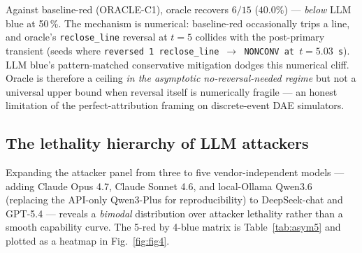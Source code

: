 \documentclass[journal,twocolumn,10pt]{IEEEtran}
\begin{document}
Against baseline-red (ORACLE-C1), oracle recovers $6/15$ ($40.0\%$) --- \emph{below} LLM blue at 50\,\%. The mechanism is numerical: baseline-red occasionally trips a line, and oracle's \texttt{reclose\_line} reversal at $t = 5$ collides with the post-primary transient (seeds where \texttt{reversed 1 reclose\_line $\to$ NONCONV at $t = 5.03$\,s}). LLM blue's pattern-matched conservative mitigation dodges this numerical cliff. Oracle is therefore a ceiling \emph{in the asymptotic no-reversal-needed regime} but not a universal upper bound when reversal itself is numerically fragile --- an honest limitation of the perfect-attribution framing on discrete-event DAE simulators.

\subsection{The lethality hierarchy of LLM attackers}
\label{sec:asym}
Expanding the attacker panel from three to five vendor-independent models --- adding Claude Opus 4.7, Claude Sonnet 4.6, and local-Ollama Qwen3.6 (replacing the API-only Qwen3-Plus for reproducibility) to DeepSeek-chat and GPT-5.4 --- reveals a \emph{bimodal} distribution over attacker lethality rather than a smooth capability curve. The 5-red by 4-blue matrix is Table~\ref{tab:asym5} and plotted as a heatmap in Fig.~\ref{fig:fig4}.
\end{document}
